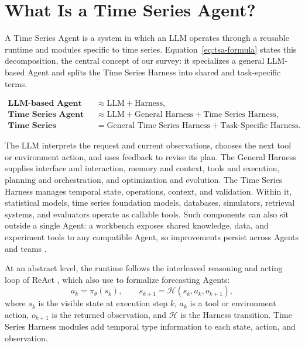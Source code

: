 \documentclass[preprints,article,submit,moreauthors]{Definitions/mdpi}
\begin{document}
\section{What Is a Time Series Agent?}
\label{sec:what-is}

A Time Series Agent is a system in which an LLM operates through a reusable runtime and modules specific to time series. Equation~\eqref{eq:tsa-formula} states this decomposition, the central concept of our survey: it specializes a general LLM-based Agent and splits the Time Series Harness into shared and task-specific terms.

\begin{tcolorbox}[
  colback=surveyWarn,
  colframe=surveyWarn,
  boxrule=0pt,
  arc=7pt,
  left=12pt,
  right=12pt,
  top=10pt,
  bottom=10pt
]
\begin{equation}
\begin{aligned}
\textbf{LLM-based Agent} &\approx \text{LLM}+\text{Harness},\\
\textbf{Time Series Agent} &\approx \text{LLM}+\text{General Harness}+\text{Time Series Harness},\\
\textbf{Time Series Harness} &= \text{General Time Series Harness}+\text{Task-Specific Harness}.
\end{aligned}
\label{eq:tsa-formula}
\end{equation}
\end{tcolorbox}

The LLM interprets the request and current observations, chooses the next tool or environment action, and uses feedback to revise its plan. The General Harness supplies interface and interaction, memory and context, tools and execution, planning and orchestration, and optimization and evolution. The Time Series Harness manages temporal state, operations, context, and validation. Within it, statistical models, time series foundation models, databases, simulators, retrieval systems, and evaluators operate as callable tools. Such components can also sit outside a single Agent: a workbench exposes shared knowledge, data, and experiment tools to any compatible Agent, so improvements persist across Agents and teams \citep{tsflab2026}.

At an abstract level, the runtime follows the interleaved reasoning and acting loop of ReAct \citep{yao2023react}, which \citet{xu2026forecastagentsurvey} also use to formalize forecasting Agents:
\begin{equation}
  a_k = \pi_\theta(s_k), \qquad
  s_{k+1} = \mathcal{H}(s_k,a_k,o_{k+1}),
  \label{eq:agent-loop}
\end{equation}
where $s_k$ is the visible state at execution step $k$, $a_k$ is a tool or environment action, $o_{k+1}$ is the returned observation, and $\mathcal{H}$ is the Harness transition. Time Series Harness modules add temporal type information to each state, action, and observation.
\end{document}
